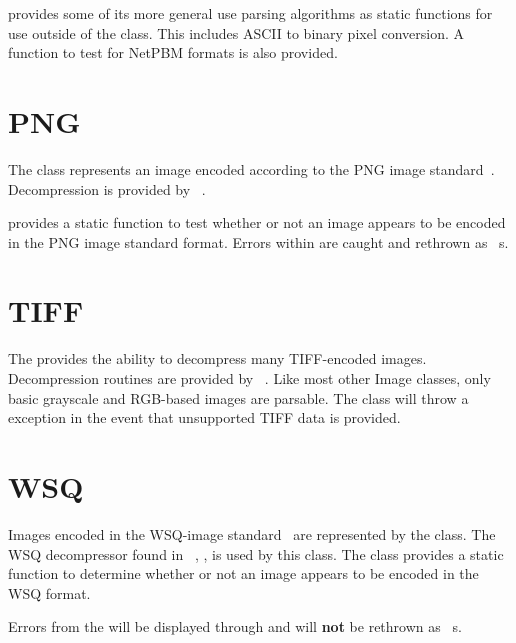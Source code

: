  provides some of its more general use parsing algorithms as
static functions for use outside of the class.  This includes ASCII to binary
pixel conversion.  A function to test for NetPBM formats is also provided.

\section{PNG}
\label{sec-image-png}
The  class represents an image encoded according to the PNG image 
standard~\cite{png}.  Decompression is provided by 
~\cite{libpng}.

 provides a static function to test whether or not an image appears
to be encoded in the PNG image standard format.  Errors within 
are caught and rethrown as ~s.

\section{TIFF}
\label{sec-image-tiff}
The  provides the ability to decompress many TIFF-encoded images.
Decompression routines are provided by ~\cite{libtiff}. Like most
other Image classes, only basic grayscale and RGB-based images are parsable. The
 class will throw a  exception in the event
that unsupported TIFF data is provided.

\section{WSQ}
\label{sec-image-wsq}
Images encoded in the WSQ-image standard~\cite{std:wsq} are represented by the 
 class.  The WSQ decompressor found in \nbis~\cite{nist:nbis}, 
, is used by this class.  The class provides a static function to determine whether or not an image appears to be encoded in the WSQ format.

Errors from the  will be displayed through 
and will {\bf not} be rethrown as ~s.

